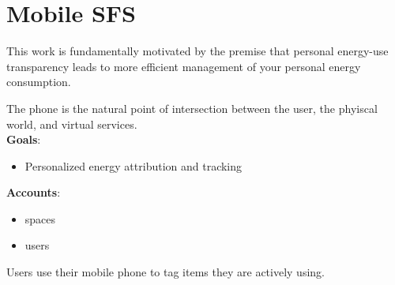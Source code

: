 \section{Mobile SFS}
This work is fundamentally motivated by the premise that personal energy-use transparency leads to more efficient
management of your personal energy consumption.


% 
%


\label{sec:mobile}
The phone is the natural point of intersection between the user, the phyiscal world, and virtual services.\\

{\bf Goals}:
\begin{itemize}
\item Personalized energy attribution and tracking \\
\end{itemize}


{\bf Accounts}:
\begin{itemize}
\item spaces
\item users \\
\end{itemize}

Users use their mobile phone to tag items they are actively using. \\

